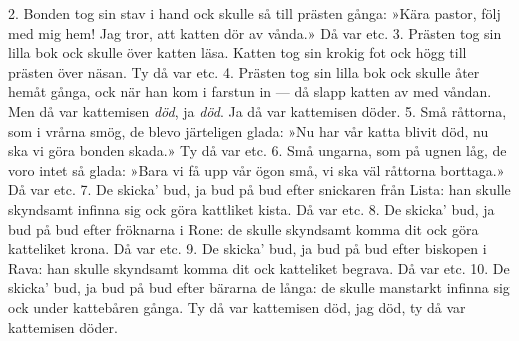 2.  Bonden tog sin stav i hand ock skulle så till prästen gånga:
    »Kära pastor, följ med mig hem! Jag tror, att katten dör av vånda.»
    \qquad{}Då var etc.
3.  Prästen tog sin lilla bok ock skulle över katten läsa.
    Katten tog sin krokig fot ock högg till prästen över näsan.
    \qquad{}Ty då var etc.
4.  Prästen tog sin lilla bok ock skulle åter hemåt gånga,
    ock när han kom i farstun in — då slapp katten av med våndan.
    \qquad{}Men då var kattemisen \textit{död}, ja \textit{död}. Ja då var kattemisen döder.
5.  Små råttorna, som i vrårna smög, de blevo järteligen glada:
    »Nu har vår katta blivit död, nu ska vi göra bonden skada.»
    \qquad{}Ty då var etc.
6.  Små ungarna, som på ugnen låg, de voro intet så glada:
    »Bara vi få upp vår ögon små, vi ska väl råttorna borttaga.»
    \qquad{}Då var etc.
7.  De skicka’ bud, ja bud på bud efter snickaren från Lista:
    han skulle skyndsamt infinna sig ock göra kattliket kista.
    \qquad{}Då var etc.
8.  De skicka’ bud, ja bud på bud efter fröknarna i Rone:
    de skulle skyndsamt komma dit ock göra katteliket krona.
    \qquad{}Då var etc.
9.  De skicka’ bud, ja bud på bud efter biskopen i Rava:
    han skulle skyndsamt komma dit ock katteliket begrava.
    \qquad{}Då var etc.
10. De skicka’ bud, ja bud på bud efter bärarna de långa:
    de skulle manstarkt infinna sig ock under kattebåren gånga.
    \qquad{}Ty då var kattemisen död, jag död, ty då var kattemisen döder.
